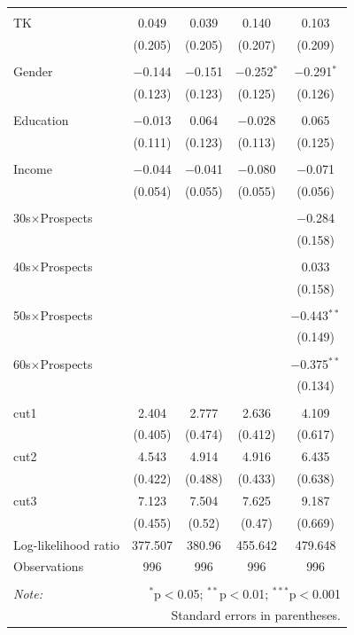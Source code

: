 \documentclass[letterpaper,9pt,twocolumn,twoside,]{pinp}
\begin{document}
\begin{table}[!htbp]
\begin{tabular}{@{\extracolsep{5pt}}lcccc}
  & & & & \\ 
 TK & 0.049 & 0.039 & 0.140 & 0.103 \\ 
  & (0.205) & (0.205) & (0.207) & (0.209) \\ 
  & & & & \\ 
 Gender & $-$0.144 & $-$0.151 & $-$0.252$^{*}$ & $-$0.291$^{*}$ \\ 
  & (0.123) & (0.123) & (0.125) & (0.126) \\ 
  & & & & \\ 
 Education & $-$0.013 & 0.064 & $-$0.028 & 0.065 \\ 
  & (0.111) & (0.123) & (0.113) & (0.125) \\ 
  & & & & \\ 
 Income & $-$0.044 & $-$0.041 & $-$0.080 & $-$0.071 \\ 
  & (0.054) & (0.055) & (0.055) & (0.056) \\ 
  & & & & \\ 
 30s$\times$Prospects &  &  &  & $-$0.284 \\ 
  &  &  &  & (0.158) \\ 
  & & & & \\ 
 40s$\times$Prospects &  &  &  & 0.033 \\ 
  &  &  &  & (0.158) \\ 
  & & & & \\ 
 50s$\times$Prospects &  &  &  & $-$0.443$^{**}$ \\ 
  &  &  &  & (0.149) \\ 
  & & & & \\ 
 60s$\times$Prospects &  &  &  & $-$0.375$^{**}$ \\ 
  &  &  &  & (0.134) \\ 
  & & & & \\ 
cut1 & 2.404 & 2.777 & 2.636 & 4.109 \\ 
 & (0.405) & (0.474) & (0.412) & (0.617) \\ 
cut2 & 4.543 & 4.914 & 4.916 & 6.435 \\ 
 & (0.422) & (0.488) & (0.433) & (0.638) \\ 
cut3 & 7.123 & 7.504 & 7.625 & 9.187 \\ 
 & (0.455) & (0.52) & (0.47) & (0.669) \\ 
Log-likelihood ratio & 377.507 & 380.96 & 455.642 & 479.648 \\ 
Observations & 996 & 996 & 996 & 996 \\ 
\hline \\[-1.8ex] 
\textit{Note:}  & \multicolumn{4}{r}{$^{*}$p$<$0.05; $^{**}$p$<$0.01; $^{***}$p$<$0.001} \\ 
 & \multicolumn{4}{r}{Standard errors in parentheses.} \\ 
\end{tabular} 
\end{table}
\end{document}
